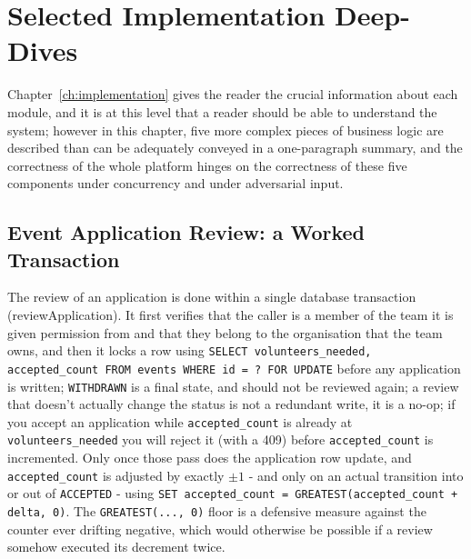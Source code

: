 \chapter[Selected Implementation Deep-Dives]{Selected Implementation Deep-Dives}
\label{ch:deepdives}
Chapter~\ref{ch:implementation} gives the reader the crucial information about each module, and it is at this level that a reader should be able to understand the system; however in this chapter, five more complex pieces of business logic are described than can be adequately conveyed in a one-paragraph summary, and the correctness of the whole platform hinges on the correctness of these five components under concurrency and under adversarial input.

\section{Event Application Review: a Worked Transaction}
\label{sec:deepdive-events}
The review of an application is done within a single database transaction (reviewApplication). It first verifies that the caller is a member of the team it is given permission from and that they belong to the organisation that the team owns, and then it locks a row using \texttt{SELECT volunteers\_needed, accepted\_count FROM events WHERE id = ? FOR UPDATE} before any application is written; \texttt{WITHDRAWN} is a final state, and should not be reviewed again; a review that doesn't actually change the status is not a redundant write, it is a no-op; if you accept an application while \texttt{accepted\_count} is already at \texttt{volunteers\_needed} you will reject it (with a 409) before \texttt{accepted\_count} is incremented. Only once those pass does the application row update, and \texttt{accepted\_count} is adjusted by exactly $\pm 1$ - and only on an actual transition into or out of \texttt{ACCEPTED} - using \texttt{SET accepted\_count = GREATEST(accepted\_count + delta, 0)}. The \texttt{GREATEST(...,\,0)} floor is a defensive measure against the counter ever drifting negative, which would otherwise be possible if a review somehow executed its decrement twice.

